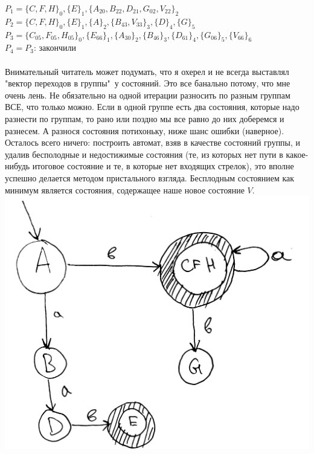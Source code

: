 \documentclass[14pt]{extreport}
\begin{document}
	$P_1=\{C, F, H\}_0,\{E\}_1,\{A_{20}, B_{22}, D_{21}, G_{02}, V_{22}\}_2$\\
	$P_2=\{C, F, H\}_0,\{E\}_1,\{A\}_2,\{B_{43}, V_{33}\}_3, \{D\}_4, \{G\}_5$\\
	$P_3=\{C_{05}, F_{05}, H_{05}\}_0,\{E_{66}\}_1,\{A_{30}\}_2,\{B_{46}\}_3, \{D_{61}
	\}_4, \{G_{06}\}_5, \{V_{66}\}_6$\\
	$P_4=P_3$: закончили\\\\
	\newpage
	Внимательный читатель может подумать, что я охерел и не всегда выставлял
	"вектор переходов в группы"\ у состояний. Это все банально потому, что мне очень лень.
	Не обязательно на одной итерации разносить по разным группам ВСЕ, что только можно.
	Если в одной группе есть два состояния, которые надо разнести по группам, то рано или поздно
	мы все равно до них доберемся и разнесем. А разнося состояния потихоньку, ниже шанс ошибки
	(наверное).\\
	Осталось всего ничего: построить автомат, взяв в качестве состояний группы, и удалив
	бесполодные и недостижимые состояния (те, из которых нет пути в какое-нибудь итоговое
	состояние и те, в которые нет входящих стрелок), это вполне успешно делается методом
	пристального взгляда. 
	Бесплодным состоянием как минимум является состояния, содержащее наше новое состояние $V$.\\
	\includegraphics[scale=0.13]{data/pic4_2.png}
	\newpage
\end{document}
